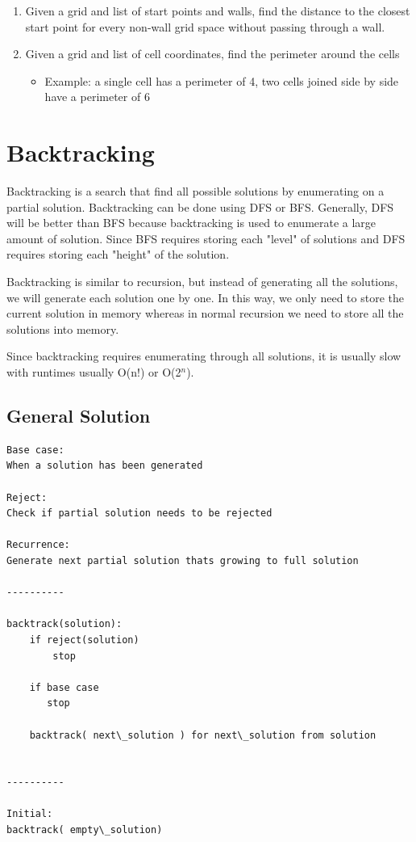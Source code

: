 \documentclass[11pt,oneside]{book}
\begin{document}
\begin{enumerate}
\item Given a grid and list of start points and walls, find the distance to the closest start point for every non-wall grid space without passing through a wall.
\item Given a grid and list of cell coordinates, find the perimeter around the cells

\begin{itemize}
\item Example: a single cell has a perimeter of 4, two cells joined side by side have a perimeter of 6
\end{itemize}
\end{enumerate}
\section{Backtracking}

Backtracking is a search that find all possible solutions by enumerating on a partial solution. Backtracking can be done using DFS or BFS. Generally, DFS will be better than BFS because backtracking is used to enumerate a large amount of solution. Since BFS requires storing each "level" of solutions and DFS requires storing each "height" of the solution.

Backtracking is similar to recursion, but instead of generating all the solutions, we will generate each solution one by one. In this way, we only need to store the current solution in memory whereas in normal recursion we need to store all the solutions into memory.

Since backtracking requires enumerating through all solutions, it is usually slow with runtimes usually O(n!) or O(2$^{n}$).

\subsection{General Solution}

\begin{lstlisting}
Base case:
When a solution has been generated

Reject:
Check if partial solution needs to be rejected

Recurrence:
Generate next partial solution thats growing to full solution

----------

backtrack(solution):
    if reject(solution)
        stop

    if base case
       stop

    backtrack( next\_solution ) for next\_solution from solution


----------

Initial:
backtrack( empty\_solution)

\end{lstlisting}
\end{document}
